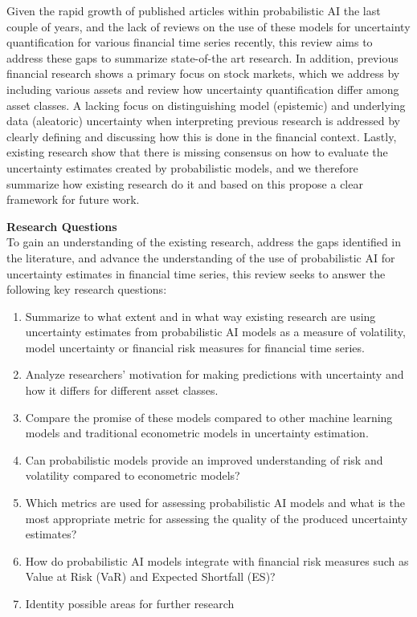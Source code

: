 Given the rapid growth of published articles within probabilistic AI the last couple of years, and the lack of reviews on the use of these models for uncertainty quantification for various financial time series recently, this review aims to address these gaps to summarize state-of-the art research. In addition, previous financial research shows a primary focus on stock markets, which we address by including various assets and review how uncertainty quantification differ among asset classes. A lacking focus on distinguishing model (epistemic) and underlying data (aleatoric) uncertainty when interpreting previous research is addressed by clearly defining and discussing how this is done in the financial context. Lastly, existing research show that there is missing consensus on how to evaluate the uncertainty estimates created by probabilistic models, and we therefore summarize how existing research do it and based on this propose a clear framework for future work. 





\textbf{Research Questions}\\
To gain an understanding of the existing research, address the gaps identified in the literature, and advance the understanding of the use of probabilistic AI for uncertainty estimates in financial time series, this review seeks to answer the following key research questions: 
\begin{enumerate}
    \item Summarize to what extent and in what way existing research are using uncertainty estimates from probabilistic AI models as a measure of volatility, model uncertainty or financial risk measures for financial time series.
    \item Analyze researchers' motivation for making predictions with uncertainty and how it differs for different asset classes.
    \item Compare the promise of these models compared to other machine learning models and traditional econometric models in uncertainty estimation.
    \item Can probabilistic models provide an improved understanding of risk and volatility compared to econometric models?
    \item Which metrics are used for assessing probabilistic AI models and what is the most appropriate metric for assessing the quality of the produced uncertainty estimates?
    \item How do probabilistic AI models integrate with financial risk measures such as Value at Risk (VaR) and Expected Shortfall (ES)?
    \item Identity possible areas for further research
\end{enumerate}

